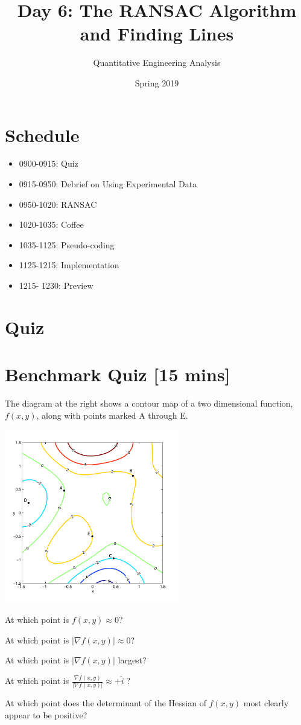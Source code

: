\documentclass{tufte-handout}
\title{Day 6: The RANSAC Algorithm and Finding Lines}
\author{Quantitative Engineering Analysis}
\date{Spring 2019}
\begin{document}
\maketitle
\thispagestyle{firstpage}

\section{Schedule}
\begin{itemize}
\item 0900-0915: Quiz
\item 0915-0950: Debrief on Using Experimental Data
\item 0950-1020: RANSAC
\item 1020-1035: Coffee
\item 1035-1125: Pseudo-coding
\item 1125-1215: Implementation
\item 1215- 1230: Preview
\end{itemize}

\section{Quiz}

\section{Benchmark Quiz [15 mins]}
\be
\item The diagram at the right shows a contour map of a two dimensional function, $f(x,y)$, along with points marked A through E.

\begin{marginfigure}
\includegraphics[width=3in]{Figures/ContourExampleForQuiz.pdf}
\end{marginfigure}
\be
\item At which point is $f(x,y) \approx 0$?
\item At which point is $|\nabla f(x,y)| \approx 0$?
\item At which point is $|\nabla f(x,y)|$ largest?
\item At which point is $\frac{\nabla f(x,y)}{|\nabla f(x,y)|} \approx +\hat{i} \;$?
\item At which point does the determinant of the Hessian of $f(x,y)$ most clearly appear to be positive?
\ee
\end{document}
